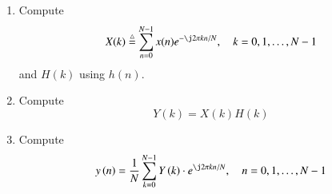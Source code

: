 \documentclass[journal,12pt,twocolumn]{IEEEtran}
\newcommand{\define}{\stackrel{\triangle}{=}}
\theoremstyle{remark}
\renewcommand\thesection{\arabic{section}}
\numberwithin{equation}{subsection}
\begin{document}
\begin{enumerate}[label=\thesection.\arabic*]
\item
Compute
\begin{equation}
X(k) \define \sum _{n=0}^{N-1}x(n) e^{-\j2\pi kn/N}, \quad k = 0,1,\dots, N-1
\end{equation}
and $H(k)$ using $h(n)$.
\item Compute 
\begin{equation}
Y(k) = X(k)H(k)
\label{eq:fp}
\end{equation}
\item Compute
\begin{equation}
y\brak{n}={\frac {1}{N}}\sum _{k=0}^{N-1}Y\brak{k}\cdot e^{\j 2\pi kn/N},\quad n = 0,1,\dots, N-1
\label{eq:I-FT}
\end{equation}

\solution 


\end{enumerate}
\end{document}
